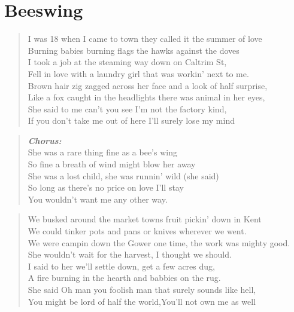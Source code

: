 \documentclass[8pt,twoside]{extarticle}
\newenvironment{xverse}{
	\interlinepenalty 10000
	\begin{verse}
	\begin{minipage}{\linewidth}
	\parskip 5pt
	\vspace{-6pt}
	}
	{
	\end{minipage}
	\end{verse}
	\penalty 0
	\vspace{-6pt}
	}
\newenvironment{chorus}{\begin{xverse}\textbf{\emph{Chorus:}}\\}{\end{xverse}}
\begin{document}
\section{Beeswing}
\begin{xverse}
I was 18 when I came to town they called it the summer of love \\
Burning babies burning flags the hawks against the doves \\
I took a job at the steaming way down on Caltrim St, \\
Fell in love with a laundry girl that was workin’ next to me. \\
Brown hair zig zagged across her face and a look of half surprise, \\
Like a fox caught in the headlights there was animal in her eyes, \\
She said to me can’t you see I’m not the factory kind, \\
If you don’t take me out of here I’ll surely lose my mind \\
\end{xverse}

\begin{chorus}
She was a rare thing fine as a bee’s wing \\
So fine a breath of wind might blow her away \\
She was a lost child, she was runnin’ wild (she said) \\
So long as there’s no price on love I’ll stay \\
You wouldn’t want me any other way. \\
\end{chorus}

\begin{xverse}
We busked around the market towns fruit pickin’ down in Kent \\
We could tinker pots and pans or knives wherever we went. \\
We were campin down the Gower one time, the work was mighty good. \\
She wouldn’t wait for the harvest, I thought we should. \\
I said to her we’ll settle down, get a few acres dug, \\
A fire burning in the hearth and babbies on the rug. \\
She said Oh man you foolish man that surely sounds like hell, \\
You might be lord of half the world,You’ll not own me as well \\
\end{xverse}
\end{document}
